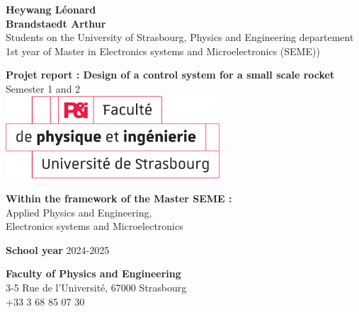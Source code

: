 \begin{titlepage}
	\raggedright
	\textbf{Heywang Léonard}	\\
    \textbf{Brandstaedt Arthur}  \\
	Students on the University of Strasbourg, Physics and Engineering departement\\
	1st year of Master in Electronics systems and Microelectronics (SEME))

	\raggedleft

	\centering
	\vspace{3cm}

	\huge
	\textbf{Projet report : Design of a control system for a small scale rocket}\\
	Semester 1 and 2\\
    \vspace{0.5cm}
	\includegraphics[width=8cm]{images/logo.eps}

	\raggedright
	\normalsize
	\vspace{3cm}
	\textbf{Within the framework of the Master SEME :}\\
	Applied Physics and Engineering, \\
	Electronics systems and Microelectronics

	\vspace{1.5cm}
	\textbf{School year} 2024-2025

	\vspace{1.5cm}
	\textbf{Faculty of Physics and Engineering}\\
	3-5 Rue de l'Université, 67000 Strasbourg\\
	+33 3 68 85 07 30

	\vspace{1 cm}
	\centering
	\begin{figure}[!ht]%
		\centering
		\qquad
	\end{figure}
\end{titlepage}
